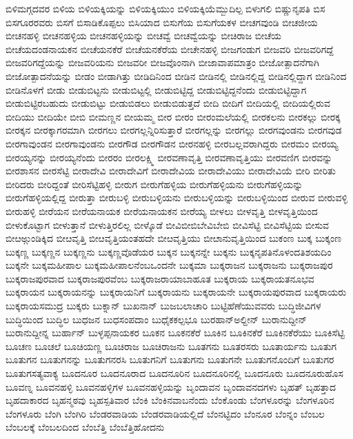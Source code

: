 {ಬಿಳಿಮಗ್ಗದವರ
ಬಿಳಿಯ
ಬಿಳಿಯಕ್ಕಿಯನ್ನು
ಬಿಳಿಯಕ್ಕಿಯುಂ
ಬಿಳಿಯಕ್ಕಿಯೆಮ್ಬುದಿಲ್ಪ
ಬಿಳುಗಲಿ
ಬಿಷ್ಣುನೃಪತಿ
ಬಿಸ
ಬಿಸಗೂರರವರು
ಬಿಸಗೆ
ಬಿಸಾಡಿಕೊಪ್ಪಲು
ಬಿಸಿಯಾದ
ಬಿಸುಗೆಯ
ಬಿಸುಗೆಯಕಳ
ಬೀಚಗವುಂಡಿ
ಬೀಚಜೀಯ
ಬೀಚನಹಳ್ಳಿ
ಬೀಚನಹಳ್ಳಿಯ
ಬೀಚನಹಳ್ಳಿಯನ್ನು
ಬೀಚವ್ವೆ
ಬೀಚವ್ವೆಯನ್ನು
ಬೀಚಿರಾಜ
ಬೀಚೆಯ
ಬೀಚೆಯದಂಡನಾಯಕನ
ಬೀಚೆಯನಕೆರೆ
ಬೀಚೆಯನಕೆರೆಯ
ಬೀಚೇನಹಳ್ಳಿ
ಬೀಜಗಂಡುಗ
ಬೀಜವರಿ
ಬೀಜವರಿಗದ್ದೆ
ಬೀಜವರಿಗದ್ದೆಯನ್ನು
ಬೀಜವರಿಯನು
ಬೀಜವರೀ
ಬೀಜವೊಂನಾಗಿ
ಬೀಜಾವಾಪಮಾತ್ರಂ
ಬೀಜೋತ್ಪಾದನೆಗಾಗಿ
ಬೀಜೋತ್ಪಾದನೆಯನ್ನು
ಬೀಡಂ
ಬೀಡಾಗಿತ್ತು
ಬೀಡಿದಿನಿಂದ
ಬೀಡಿನ
ಬೀಡಿನಲ್ಲಿ
ಬೀಡಿನಲ್ಲಿದ್ದ
ಬೀಡಿನಲ್ಲಿದ್ದಾಗ
ಬೀಡಿನಿಂದ
ಬೀಡಿನೊಳಗೆ
ಬೀಡು
ಬೀಡುಬಿಟ್ಟನು
ಬೀಡುಬಿಟ್ಟಲ್ಲಿ
ಬೀಡುಬಿಟ್ಟಿದ್ದ
ಬೀಡುಬಿಟ್ಟಿದ್ದನೆಂದು
ಬೀಡುಬಿಟ್ಟಿದ್ದಾಗ
ಬೀಡುಬಿಟ್ಟಿರಬಹುದು
ಬೀಡುಬಿಟ್ಟು
ಬೀಡುಬಿಡಲು
ಬೀಡುಬಿಡುತ್ತದೆ
ಬೀದಿ
ಬೀದಿಗೆ
ಬೀದಿಯಲ್ಲಿ
ಬೀದಿಯಲ್ಲಿರುವ
ಬೀದಿಯು
ಬೀದಿಯೇ
ಬೀಬಿ
ಬೀಮಣ್ಣನ
ಬೀಯಮ್ಮ
ಬೀರ
ಬೀರಂ
ಬೀರಂಮಲೆಯಲ್ಲಿ
ಬೀರಕಲನು
ಬೀರಕಲ್ಲು
ಬೀರಕ್ಕ
ಬೀರಕ್ಕನ
ಬೀರಕ್ಕಾಗರಮಾಗಿ
ಬೀರಗಲು
ಬೀರಗಲ್ಲನ್ನಿರಿಸುತ್ತಾರೆ
ಬೀರಗಲ್ಲನ್ನು
ಬೀರಗಲ್ಲು
ಬೀರಗವುಂಡನು
ಬೀರಗವುಡ
ಬೀರಗಾವುಂಡನ
ಬೀರಗಾವುಂಡನು
ಬೀರಗೌಡ
ಬೀರಗೌಡನ
ಬೀರನಹಳ್ಳಿ
ಬೀರಬಲ್ಲವರಾಗಿದ್ದರು
ಬೀರಮಂ
ಬೀರಯ್ಯ
ಬೀರಯ್ಯನನ್ನು
ಬೀರಯ್ಯನೆಂದು
ಬೀರರಂ
ಬೀರಲಕ್ಷ್ಮಿ
ಬೀರವಣಾವೃತ್ತಿ
ಬೀರವಣಾವೃತ್ತಿಯು
ಬೀರವಣಿಗ
ಬೀರವನ್ನು
ಬೀರಶಾಸನ
ಬೀರಸೆಟ್ಟಿ
ಬೀರಾದೇವಿ
ಬೀರಾದೇವಿಗೆ
ಬೀರಾದೇವಿಯ
ಬೀರಾದೇವಿಯು
ಬೀರಾದೇವಿಯೆ
ಬೀರಿ
ಬೀರಿತು
ಬೀರಿದರು
ಬೀರಿದ್ದಂತೆ
ಬೀರಿಸೆಟ್ಟಿಹಳ್ಳಿ
ಬೀರುಗ
ಬೀರುಗೆಹಳ್ಳಿಯ
ಬೀರುಗೆಹಳ್ಳಿಯನು
ಬೀರುಗೆಹಳ್ಳಿಯನ್ನು
ಬೀರುಗೆಹಳ್ಳಿಯಲ್ಲಿದ್ದ
ಬೀರುತ್ತಾ
ಬೀರುಬಳ್ಳಿ
ಬೀರುಬಳ್ಳಿಯನು
ಬೀರುಬಳ್ಳಿಯನ್ನು
ಬೀರುಬಳ್ಳಿಯಿಂದ
ಬೀರುವ
ಬೀರುವಳ್ಳಿ
ಬೀರುಹಳ್ಳಿ
ಬೀರೆಯನ
ಬೀರೆಯನಾಯಕ
ಬೀರೆಯನಾಯಕನ
ಬೀರೆಯ್ಯ
ಬೀಳಲು
ಬೀಳವೃತ್ತಿ
ಬೀಳವೃತ್ತಿಯಿಂದ
ಬೀಳುಕೊಟ್ಟಾಗ
ಬೀಳುತ್ತಾನೆ
ಬೀಳುತ್ತಿರಲಿಲ್ಲ
ಬೀಳ್ಕೊಡೆ
ಬೀವಿಬೀಬಿಬೇವಿಬೇಬಿ
ಬೀವಿಸೆಟ್ಟಿ
ಬೀವಿಸೆಟ್ಟಿಯ
ಬೀಸುವ
ಬೀೞಅ್ಗುಂಡಿಕ್ಕಿದ
ಬೀೞವೃತ್ತಿ
ಬೀೞವೃತ್ತಿಯಂತಹದೇ
ಬೀೞವೃತ್ತಿಯು
ಬೀೞಾನುವೃತ್ತಿಯಿಂದ
ಬುಕಂಣ
ಬುಕ್ಕ
ಬುಕ್ಕಂಣ
ಬುಕ್ಕಣ್ಣ
ಬುಕ್ಕಣ್ಣನ
ಬುಕ್ಕಣ್ಣನು
ಬುಕ್ಕಣ್ಣವೊಡೆಯರ
ಬುಕ್ಕನ
ಬುಕ್ಕನನ್ನೇ
ಬುಕ್ಕನು
ಬುಕ್ಕನೃಪತಿನೊಳಂದತಿಶಯದಿಂ
ಬುಕ್ಕನೇ
ಬುಕ್ಕಮಹೀಪಾಲ
ಬುಕ್ಕಮಹೀಪಾಲನೆಂಬಒಂದನೇ
ಬುಕ್ಕಮಾ
ಬುಕ್ಕರಾಜನ
ಬುಕ್ಕರಾಜನು
ಬುಕ್ಕರಾಜಪುರ
ಬುಕ್ಕರಾಜಪುರವಾದ
ಬುಕ್ಕರಾಜಪುರವೆಂಬ
ಬುಕ್ಕರಾಜರಾಯಾಬಾಹೂತ
ಬುಕ್ಕರಾಯ
ಬುಕ್ಕರಾಯತನೂಭವ
ಬುಕ್ಕರಾಯನ
ಬುಕ್ಕರಾಯನನ್ನು
ಬುಕ್ಕರಾಯನಿಗೆ
ಬುಕ್ಕರಾಯನು
ಬುಕ್ಕರಾಯನೇ
ಬುಕ್ಕರಾಯಪುರವಾದ
ಬುಕ್ಕರಾಯರು
ಬುಕ್ಕರಾಯಸಮುದ್ರ
ಬುಕ್ಕರು
ಬುಕ್ನಾನ್
ಬುಖನಾನ್
ಬುಜಬಲಾಚಾರಿ
ಬುಟ್ಟಿಹೆಣೆಯುವವರು
ಬುದ್ಧಿಜೀವಿಗಳ
ಬುದ್ಧಿಯಿಂದ
ಬುದ್ಧಿಲ
ಬುಧಜನ
ಬುಧಸಂಪದಾಂ
ಬುಧೈಕಕಲ್ಪಭೂ
ಬುರಹಾನ್ಅಲ್ದೀನ್
ಬುರಾನುದ್ದೀನ್
ಬುರಾನುದ್ದೀನ್ನ
ಬುರ್ಹಾನ್
ಬುಳ್ಳಪ್ಪನಾಯಕರ
ಬೂಕನ
ಬೂಕನಕೆರೆ
ಬೂಕಿನ
ಬೂಕಿನಕೆರೆ
ಬೂಕಿನಕೆರೆಯು
ಬೂಕಿಸೆಟ್ಟಿ
ಬೂಚಣ
ಬೂಚಲೆ
ಬೂಚಿಯಣ್ಣ
ಬೂಚಿರಾಜ
ಬೂಚಿರಾಜನು
ಬೂತಗನು
ಬೂತರಸರು
ಬೂತಾರ್ಯನು
ಬೂತುಗ
ಬೂತುಗನ
ಬೂತುಗನನ್ನು
ಬೂತುಗನರಸಿ
ಬೂತುಗನಿಗೆ
ಬೂತುಗನು
ಬೂತುಗನೇ
ಬೂತುಗನೊಂದಿಗೆ
ಬೂತುಗರ
ಬೂತುಗಸತ್ಯವಾಕ್ಯ
ಬೂದನೂರ
ಬೂದನೂರಾದ
ಬೂದನೂರಿನ
ಬೂದನೂರಿನಲ್ಲಿ
ಬೂದನೂರು
ಬೂದನೂರುಹೊಸ
ಬೂವಣ್ನ
ಬೂವನಹಳ್ಳಿ
ಬೂವನಹಳ್ಳಿಗಳ
ಬೂವನಹಳ್ಳಿಯನ್ನು
ಬೃಂದಾವನ
ಬೃಂದಾವನದಗಳು
ಬೃಹತ್
ಬೃಹತ್ತಾದ
ಬೃಹದಾಕಾರದ
ಬೃಹನ್ಮಠವು
ಬೃಹಸ್ಪತಿವಾರ
ಬೆಂಕಿ
ಬೆಂಕಿನವಾಬನೆಂದು
ಬೆಂಕೊಂಡು
ಬೆಂಗಳೂರನ್ನು
ಬೆಂಗಳೂರಿನ
ಬೆಂಗಳೂರು
ಬೆಂಗಿ
ಬೆಂಗಿರಿ
ಬೆಂಡರವಾಡಿಯ
ಬೆಂಡರವಾಡಿಯಲ್ಲಿದೆ
ಬೆಂನಟ್ಟಿದಂ
ಬೆಂನೂರ
ಬೆಂನ್ನಂ
ಬೆಂಬಲ
ಬೆಂಬಲಕ್ಕೆ
ಬೆಂಬಲದಿಂದ
ಬೆಂಬೆತ್ತಿ
ಬೆಂಬೆತ್ತಿಹೋದನು
}
